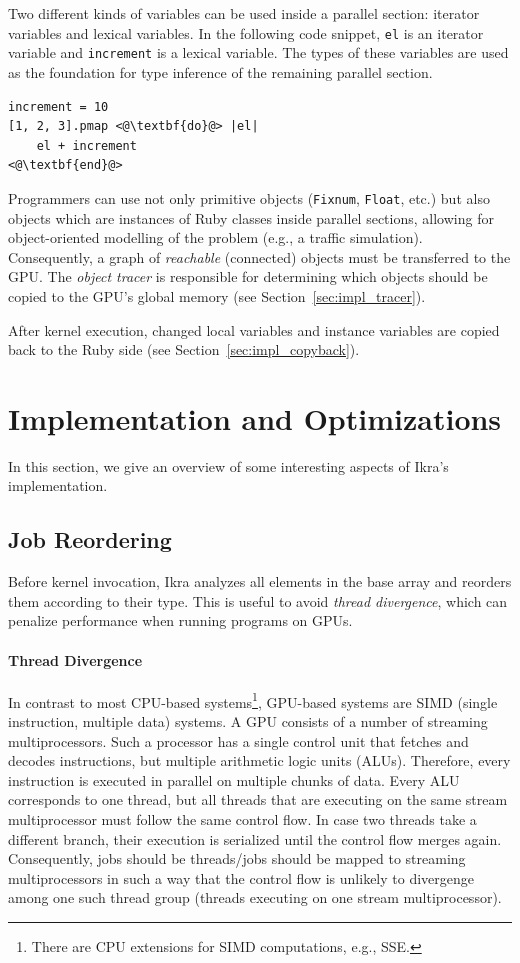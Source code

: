 \documentclass[preprint]{sigplanconf}
\begin{document}
Two different kinds of variables can be used inside a parallel section: iterator variables and lexical variables. In the following code snippet, \texttt{el} is an iterator variable and \texttt{increment} is a lexical variable. The types of these variables are used as the foundation for type inference of the remaining parallel section.
\begin{lstlisting}
increment = 10
[1, 2, 3].pmap <@\textbf{do}@> |el|
    el + increment
<@\textbf{end}@>
\end{lstlisting}

Programmers can use not only primitive objects (\texttt{Fixnum}, \texttt{Float}, etc.) but also objects which are instances of Ruby classes inside parallel sections, allowing for object-oriented modelling of the problem (e.g., a traffic simulation). Consequently, a graph of \emph{reachable} (connected) objects must be transferred to the GPU. The \emph{object tracer} is responsible for determining which objects should be copied to the GPU's global memory (see Section~\ref{sec:impl_tracer}).

After kernel execution, changed local variables and instance variables are copied back to the Ruby side (see Section~\ref{sec:impl_copyback}).


\section{Implementation and Optimizations}
In this section, we give an overview of some interesting aspects of Ikra's implementation.

\subsection{Job Reordering}
Before kernel invocation, Ikra analyzes all elements in the base array and reorders them according to their type. This is useful to avoid \emph{thread divergence}, which can penalize performance when running programs on GPUs.

\paragraph{Thread Divergence}
In contrast to most CPU-based systems\footnote{There are CPU extensions for SIMD computations, e.g., SSE.}, GPU-based systems are SIMD (single instruction, multiple data) systems. A GPU consists of a number of streaming multiprocessors. Such a processor has a single control unit that fetches and decodes instructions, but multiple arithmetic logic units (ALUs). Therefore, every instruction is executed in parallel on multiple chunks of data. Every ALU corresponds to one thread, but all threads that are executing on the same stream multiprocessor must follow the same control flow. In case two threads take a different branch, their execution is serialized until the control flow merges again. Consequently, jobs should be threads/jobs should be mapped to streaming multiprocessors in such a way that the control flow is unlikely to divergenge among one such thread group (threads executing on one stream multiprocessor).
\end{document}
